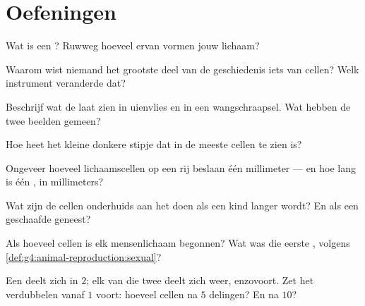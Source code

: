 \section{Oefeningen}

\begin{exercise}[$\star$]\label{exo:g5:first-look-at-cells:1}
Wat is een ? Ruwweg hoeveel ervan vormen jouw lichaam?
\end{exercise}

\begin{exercise}[$\star$]\label{exo:g5:first-look-at-cells:2}
Waarom wist niemand het grootste deel van de geschiedenis iets van
cellen? Welk instrument veranderde dat?
\end{exercise}

\begin{exercise}[$\star$]\label{exo:g5:first-look-at-cells:3}
Beschrijf wat de  laat zien in uienvlies en in een
wangschraapsel. Wat hebben de twee beelden gemeen?
\end{exercise}

\begin{exercise}[$\star$]\label{exo:g5:first-look-at-cells:4}
Hoe heet het kleine donkere stipje dat in de meeste cellen te zien is?
\end{exercise}

\begin{exercise}[$\star$]\label{exo:g5:first-look-at-cells:5}
Ongeveer hoeveel lichaamscellen op een rij beslaan één millimeter ---
en hoe lang is één , in millimeters?
\end{exercise}

\begin{exercise}[$\star$]\label{exo:g5:first-look-at-cells:6}
Wat zijn de cellen onderhuids aan het doen als een kind langer wordt? En
als een geschaafde  geneest?
\end{exercise}

\begin{exercise}[$\star$]\label{exo:g5:first-look-at-cells:7}
Als hoeveel cellen is elk mensenlichaam begonnen? Wat was die eerste
, volgens \cref{def:g4:animal-reproduction:sexual}?
\end{exercise}

\begin{exercise}[$\star$]\label{exo:g5:first-look-at-cells:8}
Een  deelt zich in $2$; elk van die twee deelt zich weer, enzovoort.
Zet het verdubbelen vanaf $1$ voort: hoeveel cellen na $5$ delingen? En
na $10$?
\end{exercise}

